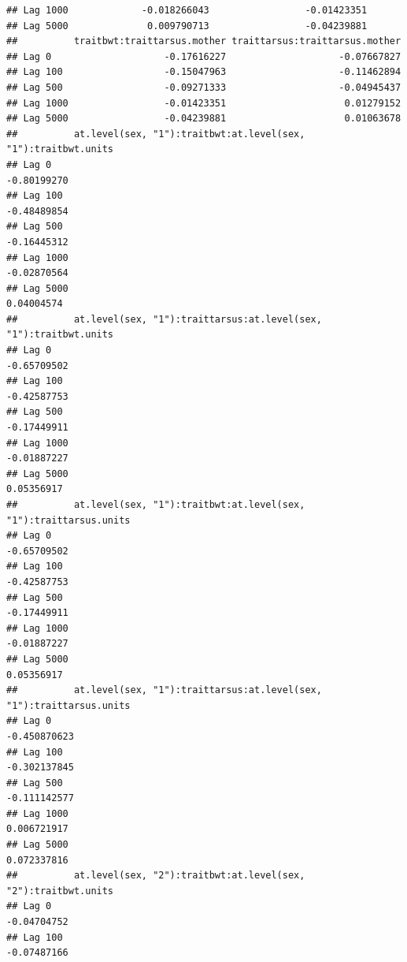 \documentclass[
  12pt,
]{book}
\begin{document}
\begin{verbatim}
## Lag 1000             -0.018266043                 -0.01423351
## Lag 5000              0.009790713                 -0.04239881
##          traitbwt:traittarsus.mother traittarsus:traittarsus.mother
## Lag 0                    -0.17616227                    -0.07667827
## Lag 100                  -0.15047963                    -0.11462894
## Lag 500                  -0.09271333                    -0.04945437
## Lag 1000                 -0.01423351                     0.01279152
## Lag 5000                 -0.04239881                     0.01063678
##          at.level(sex, "1"):traitbwt:at.level(sex, "1"):traitbwt.units
## Lag 0                                                      -0.80199270
## Lag 100                                                    -0.48489854
## Lag 500                                                    -0.16445312
## Lag 1000                                                   -0.02870564
## Lag 5000                                                    0.04004574
##          at.level(sex, "1"):traittarsus:at.level(sex, "1"):traitbwt.units
## Lag 0                                                         -0.65709502
## Lag 100                                                       -0.42587753
## Lag 500                                                       -0.17449911
## Lag 1000                                                      -0.01887227
## Lag 5000                                                       0.05356917
##          at.level(sex, "1"):traitbwt:at.level(sex, "1"):traittarsus.units
## Lag 0                                                         -0.65709502
## Lag 100                                                       -0.42587753
## Lag 500                                                       -0.17449911
## Lag 1000                                                      -0.01887227
## Lag 5000                                                       0.05356917
##          at.level(sex, "1"):traittarsus:at.level(sex, "1"):traittarsus.units
## Lag 0                                                           -0.450870623
## Lag 100                                                         -0.302137845
## Lag 500                                                         -0.111142577
## Lag 1000                                                         0.006721917
## Lag 5000                                                         0.072337816
##          at.level(sex, "2"):traitbwt:at.level(sex, "2"):traitbwt.units
## Lag 0                                                      -0.04704752
## Lag 100                                                    -0.07487166

\end{verbatim}
\end{document}
